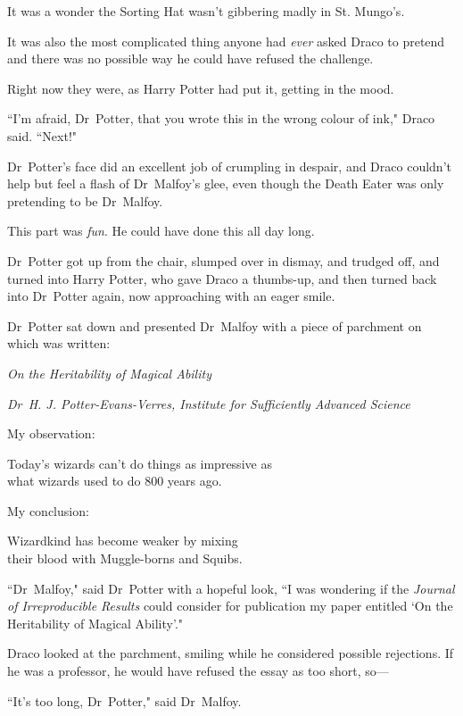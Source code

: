 It was a wonder the Sorting Hat wasn't gibbering madly in St. Mungo's.

It was also the most complicated thing anyone had \emph{ever} asked Draco to pretend and there was no possible way he could have refused the challenge.

Right now they were, as Harry Potter had put it, getting in the mood.

``I'm afraid, Dr~Potter, that you wrote this in the wrong colour of ink," Draco said. ``Next!"

Dr~Potter's face did an excellent job of crumpling in despair, and Draco couldn't help but feel a flash of Dr~Malfoy's glee, even though the Death Eater was only pretending to be Dr~Malfoy.

This part was \emph{fun}. He could have done this all day long.

Dr~Potter got up from the chair, slumped over in dismay, and trudged off, and turned into Harry Potter, who gave Draco a thumbs-up, and then turned back into Dr~Potter again, now approaching with an eager smile.

Dr~Potter sat down and presented Dr~Malfoy with a piece of parchment on which was written:

\begin{center}
\emph{On the Heritability of Magical Ability}

\emph{Dr~H. J. Potter-Evans-Verres, Institute for Sufficiently Advanced Science}
\end{center}

\begin{writtenNote}
My observation:

Today's wizards can't do things as impressive as\\
what wizards used to do 800 years ago.

My conclusion:

Wizardkind has become weaker by mixing\\
their blood with Muggle-borns and Squibs.
\end{writtenNote}

``Dr~Malfoy," said Dr~Potter with a hopeful look, ``I was wondering if the \emph{Journal of Irreproducible Results} could consider for publication my paper entitled `On the Heritability of Magical Ability'."

Draco looked at the parchment, smiling while he considered possible rejections. If he was a professor, he would have refused the essay as too short, so—

``It's too long, Dr~Potter," said Dr~Malfoy.

